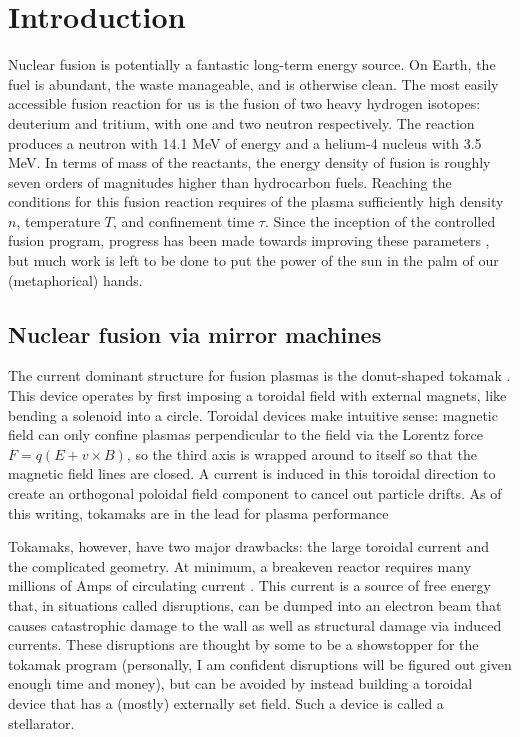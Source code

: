 \graphicspath{{Chapters/Chapter_intro/}}

\chapter{Introduction}
\label{ch:intro}

Nuclear fusion is potentially a fantastic long-term energy source. On Earth, the fuel is abundant, the waste manageable, and is otherwise clean. The most easily accessible fusion reaction for us is the fusion of two heavy hydrogen isotopes: deuterium and tritium, with one and two neutron respectively. The reaction produces a neutron with 14.1 MeV of energy and a helium-4 nucleus with 3.5 MeV. In terms of mass of the reactants, the energy density of fusion is roughly seven orders of magnitudes higher than hydrocarbon fuels. Reaching the conditions for this fusion reaction requires of the plasma sufficiently high density $n$, temperature $T$, and confinement time $\tau$. Since the inception of the controlled fusion program, progress has been made towards improving these parameters \cite{wurzel_progress_2022}, but much work is left to be done to put the power of the sun in the palm of our (metaphorical) hands.

\section{Nuclear fusion via mirror machines}

The current dominant structure for fusion plasmas is the donut-shaped tokamak \cite{john_wesson_tokamaks_2004}. This device operates by first imposing a toroidal field with external magnets, like bending a solenoid into a circle. Toroidal devices make intuitive sense: magnetic field can only confine plasmas perpendicular to the field via the Lorentz force $F = q(E + v \times B)$, so the third axis is wrapped around to itself so that the magnetic field lines are closed. A current is induced in this toroidal direction to create an orthogonal poloidal field component to cancel out particle drifts. As of this writing, tokamaks are in the lead for plasma performance \cite{wurzel_progress_2022}

Tokamaks, however, have two major drawbacks: the large toroidal current and the complicated geometry. At minimum, a breakeven reactor requires many millions of Amps of circulating current \cite{creely_overview_2020}. This current is a source of free energy that, in situations called disruptions, can be dumped into an electron beam that causes catastrophic damage to the wall as well as structural damage via induced currents. These disruptions are thought by some to be a showstopper for the tokamak program (personally, I am confident disruptions will be figured out given enough time and money), but can be avoided by instead building a toroidal device that has a (mostly) externally set field. Such a device is called a stellarator.

